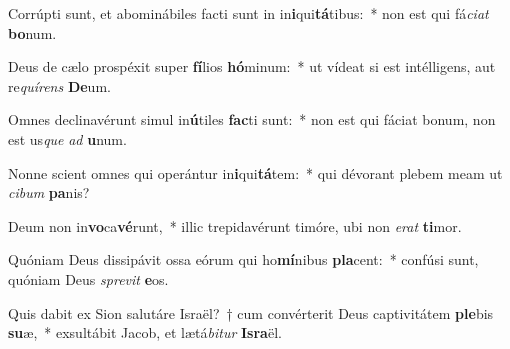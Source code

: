 \item Corrúpti sunt, et abominábiles facti sunt in in\textbf{i}qui\textbf{tá}tibus:~* non est qui fá\textit{ci}\textit{at} \textbf{bo}num.
\item Deus de cælo prospéxit super \textbf{fí}lios \textbf{hó}minum:~* ut vídeat si est intélligens, aut re\textit{quí}\textit{rens} \textbf{De}um.
\item Omnes declinavérunt simul in\textbf{ú}tiles \textbf{fac}ti sunt:~* non est qui fáciat bonum, non est us\textit{que} \textit{ad} \textbf{u}num.
\item Nonne scient omnes qui operántur in\textbf{i}qui\textbf{tá}tem:~* qui dévorant plebem meam ut \textit{ci}\textit{bum} \textbf{pa}nis?
\item Deum non in\textbf{vo}ca\textbf{vé}runt,~* illic trepidavérunt timóre, ubi non \textit{e}\textit{rat} \textbf{ti}mor.
\item Quóniam Deus dissipávit ossa eórum qui ho\textbf{mí}nibus \textbf{pla}cent:~* confúsi sunt, quóniam Deus \textit{spre}\textit{vit} \textbf{e}os.
\item Quis dabit ex Sion salutáre Israël?~† cum convérterit Deus captivitátem \textbf{ple}bis \textbf{su}æ,~* exsultábit Jacob, et lætá\textit{bi}\textit{tur} \textbf{Is}\textbf{ra}ël.
